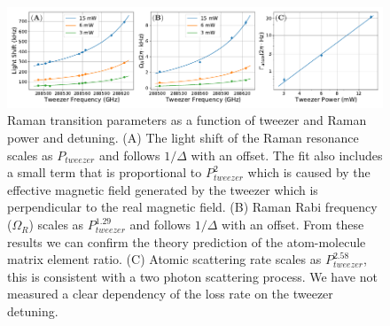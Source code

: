 \documentclass[aps,prl,twocolumn,superscriptaddress]{revtex4-1}
\begin{document}
\begin{figure}
  \includegraphics[width=\textwidth]{fig4.pdf}
  \caption{Raman transition parameters as a function of tweezer and Raman power and detuning.
    (A) The light shift of the Raman resonance scales as $P_{tweezer}$
    and follows $1/\Delta$ with an offset.
    The fit also includes a small term that is proportional to $P_{tweezer}^2$
    which is caused by the effective magnetic field generated by the tweezer which is
    perpendicular to the real magnetic field.
    (B) Raman Rabi frequency ($\Omega_R$) scales as $P_{tweezer}^{1.29}$
    and follows $1/\Delta$ with an offset.
    From these results we can confirm the theory prediction of
    the atom-molecule matrix element ratio.
    (C) Atomic scattering rate scales as $P_{tweezer}^{2.58}$,
    this is consistent with a two photon scattering process.
    We have not measured a clear dependency of the loss rate on the tweezer detuning.
    \label{f-det}}
\end{figure}
\end{document}
